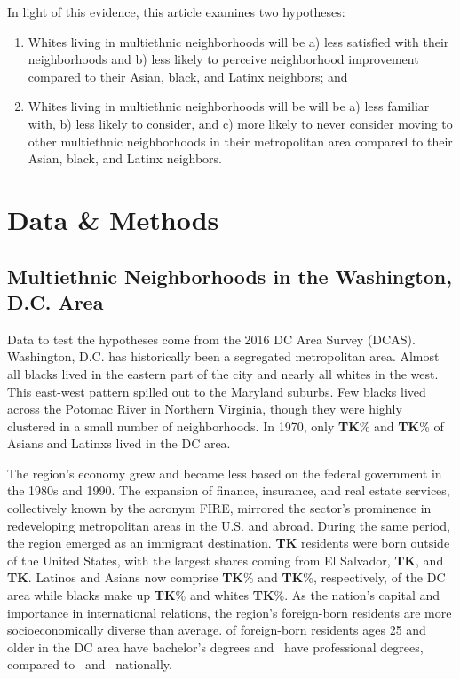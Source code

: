 \documentclass{baderart}
\providecommand{\tightlist}{%
  \setlength{\itemsep}{0pt}\setlength{\parskip}{0pt}}
\newcommand{\TK}[1][]{\strong{TK #1}}
\begin{document}
In light of this evidence, this article examines two hypotheses:


\begin{enumerate} \def\labelenumi{\arabic{enumi}.} \tightlist \item   Whites living in multiethnic neighborhoods will be a) less satisfied   with their neighborhoods and b) less likely to perceive neighborhood   improvement compared to their Asian, black, and Latinx neighbors; and \item   Whites living in multiethnic neighborhoods will be will be a) less   familiar with, b) less likely to consider, and c) more likely to never   consider moving to other multiethnic neighborhoods in their   metropolitan area compared to their Asian, black, and Latinx   neighbors. \end{enumerate}

\section{Data \& Methods}\label{data}
\subsection{Multiethnic Neighborhoods in the Washington, D.C. Area}\label{multiethnic-neighborhoods-in-the-washington-d.c.-area}

Data to test the hypotheses come from the 2016 DC Area Survey (DCAS). Washington, D.C. has historically been a segregated metropolitan area. Almost all blacks lived in the eastern part of the city and nearly all whites in the west. This east-west pattern spilled out to the Maryland suburbs. Few blacks lived across the Potomac River in Northern Virginia, though they were highly clustered in a small number of neighborhoods. In 1970, only \textbf{TK}\% and \textbf{TK}\% of Asians and Latinxs lived in the DC area.

The region's economy grew and became less based on the federal government in the 1980s and 1990. The expansion of finance, insurance, and real estate services, collectively known by the acronym FIRE, mirrored the sector's prominence in redeveloping metropolitan areas in the U.S. and abroad. During the same period, the region emerged as an immigrant destination. \textbf{TK} residents were born outside of the United States, with the largest shares coming from El Salvador, \textbf{TK}, and \textbf{TK}. Latinos and Asians now comprise \textbf{TK}\% and \textbf{TK}\%, respectively, of the DC area while blacks make up \textbf{TK}\% and whites \textbf{TK}\%. As the nation's capital and importance in international relations, the region's foreign-born residents are more socioeconomically diverse than average. \TK[\%] of foreign-born residents ages 25 and older in the DC area have bachelor's degrees and \TK[\%]\ have professional degrees, compared to \TK[\%]\ and \TK[\%]\ nationally. 
\end{document}
